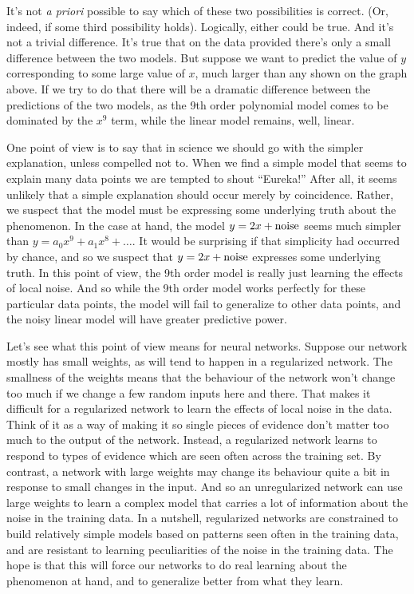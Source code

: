 \documentclass[a4paper,twoside,10pt]{book}
\begin{document}
It's not \textit{a priori} possible to say which of these two possibilities is correct. (Or, indeed, if some third possibility holds). Logically, either could be true. And it's not a trivial difference. It's true that on the data provided there's only a small difference between the two models. But suppose we want to predict the value of $y$ corresponding to some large value of $x$, much larger than any shown on the graph above. If we try to do that there will be a dramatic difference between the predictions of the two models, as the 9th order polynomial model comes to be dominated by the $x^9$ term, while the linear model remains, well, linear.

One point of view is to say that in science we should go with the simpler explanation, unless compelled not to. When we find a simple model that seems to explain many data points we are tempted to shout ``Eureka!'' After all, it seems unlikely that a simple explanation should occur merely by coincidence. Rather, we suspect that the model must be expressing some underlying truth about the phenomenon. In the case at hand, the model $y=2x+{\rm noise}$ seems much simpler than $y=a_0x^9+a_1x^8+\ldots$. It would be surprising if that simplicity had occurred by chance, and so we suspect that $y=2x+{\rm noise}$ expresses some underlying truth. In this point of view, the 9th order model is really just learning the effects of local noise. And so while the 9th order model works perfectly for these particular data points, the model will fail to generalize to other data points, and the noisy linear model will have greater predictive power.

Let's see what this point of view means for neural networks. Suppose our network mostly has small weights, as will tend to happen in a regularized network. The smallness of the weights means that the behaviour of the network won't change too much if we change a few random inputs here and there. That makes it difficult for a regularized network to learn the effects of local noise in the data. Think of it as a way of making it so single pieces of evidence don't matter too much to the output of the network. Instead, a regularized network learns to respond to types of evidence which are seen often across the training set. By contrast, a network with large weights may change its behaviour quite a bit in response to small changes in the input. And so an unregularized network can use large weights to learn a complex model that carries a lot of information about the noise in the training data. In a nutshell, regularized networks are constrained to build relatively simple models based on patterns seen often in the training data, and are resistant to learning peculiarities of the noise in the training data. The hope is that this will force our networks to do real learning about the phenomenon at hand, and to generalize better from what they learn.
\end{document}
